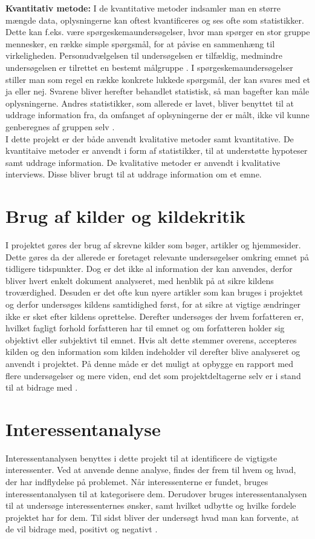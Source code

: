 \noindent\textbf{Kvantitativ metode:}
I de kvantitative metoder indsamler man en større mængde data, oplysningerne kan oftest kvantificeres og ses ofte som statistikker. Dette kan f.eks. være spørgeskemaundersøgelser, hvor man spørger en stor gruppe mennesker, en række simple spørgsmål, for at påvise en sammenhæng til virkeligheden. Personudvælgelsen til undersøgelsen er tilfældig, medmindre undersøgelsen er tilrettet en bestemt målgruppe \citep{Kvan}. I spørgeskemaundersøgelser stiller man som regel en række konkrete lukkede spørgsmål, der kan svares med et ja eller nej. Svarene bliver herefter behandlet statistisk, så man bagefter kan måle oplysningerne. Andres statistikker, som allerede er lavet, bliver benyttet til at uddrage information fra, da omfanget af oplsyningerne der er målt, ikke vil kunne genberegnes af gruppen selv \citep{Gymportalen}.\\ 

\noindent I dette projekt er der både anvendt kvalitative metoder samt kvantitative. De kvantitaive metoder er anvendt i form af statistikker, til at understøtte hypoteser samt uddrage information. De kvalitative metoder er anvendt i kvalitative interviews. Disse bliver brugt til at uddrage information om et emne.

\section{Brug af kilder og kildekritik}
I projektet gøres der brug af skrevne kilder som bøger, artikler og hjemmesider. Dette gøres da der allerede er foretaget relevante undersøgelser omkring emnet på tidligere tidspunkter. Dog er det ikke al information der kan anvendes, derfor bliver hvert enkelt dokument analyseret, med henblik på at sikre kildens troværdighed. Desuden er det ofte kun nyere artikler som kan bruges i projektet og derfor undersøges kildens samtidighed først, for at sikre at vigtige ændringer ikke er sket efter kildens oprettelse. Derefter undersøges der hvem forfatteren er, hvilket fagligt forhold forfatteren har til emnet og om forfatteren holder sig objektivt eller subjektivt til emnet. Hvis alt dette stemmer overens, accepteres kilden og den information som kilden indeholder vil derefter blive analyseret og anvendt i projektet. På denne måde er det muligt at opbygge en rapport med flere undersøgelser og mere viden, end det som projektdeltagerne selv er i stand til at bidrage med \citep{Kildekritik}.

\section{Interessentanalyse}
Interessentanalysen benyttes i dette projekt til at identificere de vigtigste interessenter. Ved at anvende denne analyse, findes der frem til hvem og hvad, der har indflydelse på problemet. Når interessenterne er fundet, bruges interessentanalysen til at kategorisere dem. Derudover bruges interessentanalysen til at undersøge interessenternes ønsker, samt hvilket udbytte og hvilke fordele projektet har for dem. Til sidst bliver der undersøgt hvad man kan forvente, at de vil bidrage med, positivt og negativt \citep{MetteLindegaardAttrup2008}.

